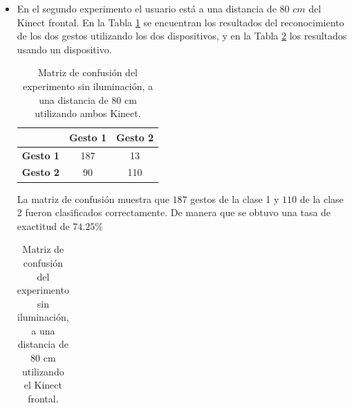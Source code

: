 \begin{itemize}
La matriz de confusión muestra que $154$ gestos de la clase 1 y $133$ de la clase 2 fueron clasificados correctamente. De manera que se obtuvo una tasa de exactitud de $46.75 \%$ 


\item En el segundo experimento el usuario est\'a a una distancia de $80$ $cm$ del Kinect frontal. En la Tabla \ref{table:80LnoK2} se encuentran los resultados del reconocimiento de los dos gestos utilizando los dos dispositivos, y en la Tabla \ref{table:80LnoK1} los resultados usando un dispositivo.   


\begin{table}[h!] 
\begin{center} 
\caption{Matriz de confusión del experimento sin iluminación, a una distancia de 80 cm utilizando ambos Kinect.}
\label{table:80LnoK2} 
\renewcommand{\arraystretch}{1.2}
\begin{tabular}{ r || c  c } 
 
        & \textbf{Gesto 1} & \textbf{Gesto 2} \\ \hline \hline  
\textbf{Gesto 1} & 187     &  13     \\ \hline  
\textbf{Gesto 2} & 90     &  110     \\   

\end{tabular}
\end{center} 
\end{table}  

La matriz de confusión muestra que $187$ gestos de la clase 1 y $110$ de la clase 2 fueron clasificados correctamente. De manera que se obtuvo una tasa de exactitud de $74.25 \%$ 

\begin{table}[h!] 
\begin{center} 
\caption{Matriz de confusión del experimento sin iluminación, a una distancia de 80 cm utilizando el Kinect frontal.}
\label{table:80LnoK1}
\renewcommand{\arraystretch}{1.2}
\begin{tabular}{ r || c  c } 
 

\end{tabular}
\end{center}
\end{table}
\end{itemize}
